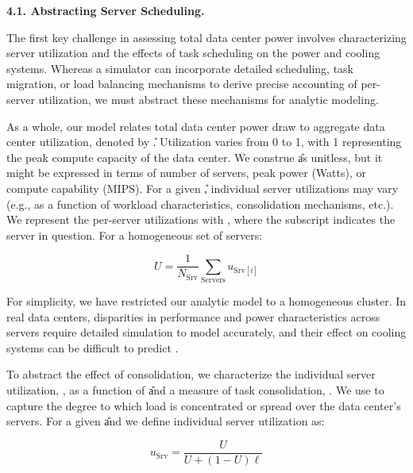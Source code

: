 {\bf 4.1. Abstracting Server Scheduling.}

The first key challenge in assessing total data center power involves characterizing server utilization and the effects of task scheduling on the power and cooling systems.  Whereas a simulator can incorporate detailed scheduling, task migration, or load balancing mechanisms to derive precise accounting of per-server utilization, we must abstract these mechanisms for analytic modeling.

As a whole, our model relates total data center power draw to aggregate data center utilization, denoted by \U.  Utilization varies from 0 to 1, with 1 representing the peak compute capacity of the data center.  We construe \U as unitless, but it might be expressed in terms of number of servers, peak power (Watts), or compute capability (MIPS).
For a given \U, individual server utilizations may vary (e.g., as a function of workload characteristics, consolidation mechanisms, etc.). We represent the per-server utilizations with \usrv, where the subscript indicates the server in question.
For a homogeneous set of  servers:

\begin{equation}
 U = \frac{1}{N_{\mathrm{Srv}}}\sum_{\mathrm{Servers}}u_{\mathrm{Srv}[i]}
\end{equation}

For simplicity, we have restricted our analytic model to a homogeneous cluster.
In real data centers, disparities in performance and power characteristics across servers require detailed simulation to model accurately, and their effect on cooling systems can be difficult to predict \cite{Nathuji08}.


To abstract the effect of consolidation, we characterize the individual server utilization, \usrv, as a function of \U and a measure of task consolidation, \el.  We use \el to capture the degree to which load is concentrated or spread over the data center's servers. For a given \U and \el we define individual server utilization as:

\begin{equation}
u_{\mathrm{Srv}} = \frac{U}{U + (1-U)\ell}
\end{equation}

